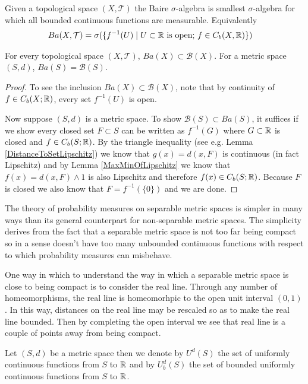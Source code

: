 \begin{defn}Given a topological space $(X, \mathcal{T})$ the Baire
  $\sigma$-algebra is smallest $\sigma$-algebra for which all bounded
  continuous functions are measurable.  Equivalently 
\begin{align*}
Ba(X,\mathcal{T}) &= \sigma(\lbrace f^{-1}(U) \mid U \subset \mathbb{R}
\text{ is open; } f \in C_b(X,\mathbb{R})\rbrace)
\end{align*}
\end{defn}
\begin{lem}For every topological space $(X, \mathcal{T})$, $Ba(X)
  \subset \mathcal{B}(X)$.  For a metric space $(S,d)$, $Ba(S) = \mathcal{B}(S)$.
\end{lem}
\begin{proof}
To see the inclusion $Ba(X)
  \subset \mathcal{B}(X)$, note that by continuity of $f \in
  C_b(X;\mathbb{R})$, every set $f^{-1}(U)$ is open.

Now suppose $(S,d)$ is a metric space.  To show $\mathcal{B}(S)
\subset Ba(S)$, it suffices if we show every closed set $F \subset S$
can be written as $f^{-1}(G)$ where $G \subset \mathbb{R}$ is closed and
$f \in C_b(S; \mathbb{R})$.  By the triangle inequality (see e.g. Lemma
\ref{DistanceToSetLipschitz}) we know
that $g(x) = d(x, F)$ is continuous (in fact Lipschitz) and by Lemma
\ref{MaxMinOfLipschitz} we know that $f(x) = d(x, F) \wedge 1$ is also
Lipschitz and therefore $f(x) \in C_b(S; \mathbb{R})$.  Because $F$ is
closed we also know that $F = f^{-1}(\lbrace 0 \rbrace)$ and we are done.
\end{proof}

The theory of probability measures on separable metric spaces is simpler in many ways than its general counterpart 
for non-separable metric spaces. The simplicity derives from the fact that a separable metric space is not too far being compact
so in a sense doesn't have too many unbounded continuous functions with respect to which probability measures can misbehave.

One way in which to understand the way in which a separable metric space is close to being compact is to consider the real line.  Through any number of homeomorphisms, the real line is homeomorhpic to the open unit interval $(0,1)$.  In this way, distances on the real line may be rescaled so as to make the real line bounded.  Then by completing the open interval we see that real line is a couple of points away from being compact.

\begin{defn}Let $(S,d)$ be a metric space then we denote by $U^d(S)$ the set of uniformly continuous functions from $S$ to $\mathbb{R}$ and by $U_b^d(S)$ the set of bounded uniformly continuous functions from $S$ to $\mathbb{R}$.
\end{defn}

